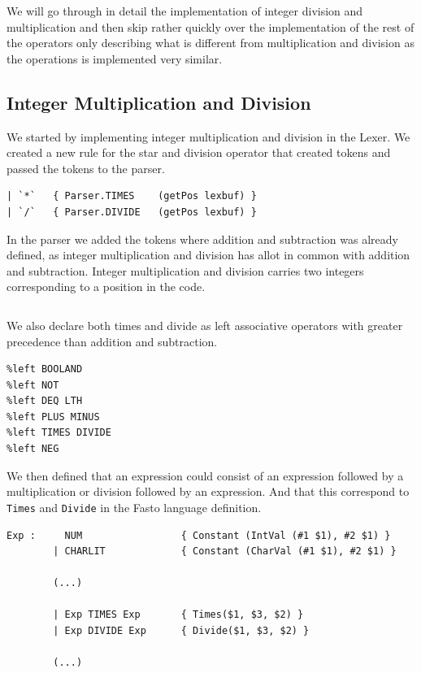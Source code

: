 \documentclass[11pt]{article}
\begin{document}
    We will go through in detail the implementation of integer division and
    multiplication and then skip rather quickly over the implementation of the
    rest of the operators only describing what is different from multiplication
    and division as the operations is implemented very similar.

    \subsection{Integer Multiplication and Division}
    We started by implementing integer multiplication and division in the Lexer.
    We created a new rule for the star and division operator that created tokens
    and passed the tokens to the parser.

    \begin{lstlisting}[firstnumber=84]
| `*`   { Parser.TIMES    (getPos lexbuf) }
| `/`   { Parser.DIVIDE   (getPos lexbuf) }
    \end{lstlisting}

    In the parser we added the tokens where addition and subtraction was already
    defined, as integer multiplication and division has allot in common with
    addition and subtraction.  Integer multiplication and division carries two
    integers corresponding to a position in the code.

    \begin{lstlisting}[firstnumber=15]
%token <(int*int)> PLUS MINUS TIMES DIVIDE DEQ EQ LTH BOOLAND BOOLOR NOT NEG
    \end{lstlisting}

    We also declare both times and divide as left associative operators with
    greater precedence than addition and subtraction.

    \begin{lstlisting}[firstnumber=23]
%left BOOLOR
%left BOOLAND
%left NOT
%left DEQ LTH
%left PLUS MINUS
%left TIMES DIVIDE
%left NEG
    \end{lstlisting}

    We then defined that an expression could consist of an expression followed
    by a multiplication or division followed by an expression.  And that this
    correspond to \texttt{Times} and \texttt{Divide} in the Fasto language
    definition.

    \begin{lstlisting}[firstnumber=76]
Exp :     NUM                 { Constant (IntVal (#1 $1), #2 $1) }
        | CHARLIT             { Constant (CharVal (#1 $1), #2 $1) }

        (...)

        | Exp TIMES Exp       { Times($1, $3, $2) }
        | Exp DIVIDE Exp      { Divide($1, $3, $2) }

        (...)
    \end{lstlisting}
\end{document}
